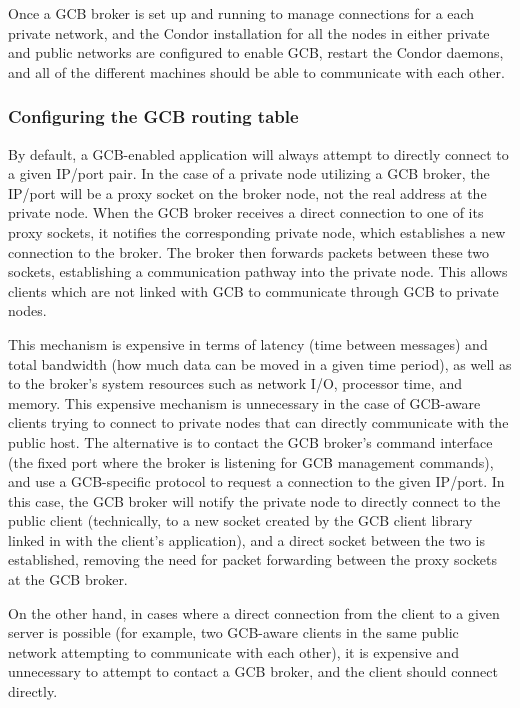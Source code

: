 Once a GCB broker is set up and running to manage connections for a
each private network, and the Condor installation for all the nodes in
either private and public networks are configured to enable GCB,
restart the Condor daemons, and all of the different machines
should be able to communicate with each other.


\subsubsection{\label{sec:GCB-routing-table}Configuring the GCB
  routing table} 

By default, a GCB-enabled application will always attempt to directly
connect to a given IP/port pair.
In the case of a private node utilizing a GCB broker, the
IP/port will be a proxy socket on the broker node, not the real
address at the private node.
When the GCB broker receives a direct connection to one of its proxy 
sockets, it notifies the corresponding private node, which
establishes a new connection to the broker.
The broker then forwards packets between these two sockets,
establishing a communication pathway into the private node.
This allows clients which are not linked with GCB to communicate
through GCB to private nodes.

This mechanism is expensive
in terms of latency (time between messages) and total bandwidth
(how much data can be moved in a given time period),
as well as to the broker's
system resources such as network I/O, processor time, and memory.
This expensive mechanism is 
unnecessary in the case of
GCB-aware clients trying to connect to private nodes that can directly
communicate with the public host.
The alternative is to contact the GCB broker's command interface (the
fixed port where the broker is listening for GCB management commands),
and use
a GCB-specific protocol to request a connection to the given IP/port.
In this case, the GCB broker will notify the private node to directly
connect to the public client (technically, to a new socket created by
the GCB client library linked in with the client's application), and a
direct socket between the two is established, removing the need for
packet forwarding between the proxy sockets at the GCB broker.

On the other hand, in cases where a direct connection from the client
to a given server is possible
(for example, two GCB-aware clients in the same
public network attempting to communicate with each other),
it is
expensive and unnecessary to attempt to contact a GCB broker, and the
client should connect directly.

